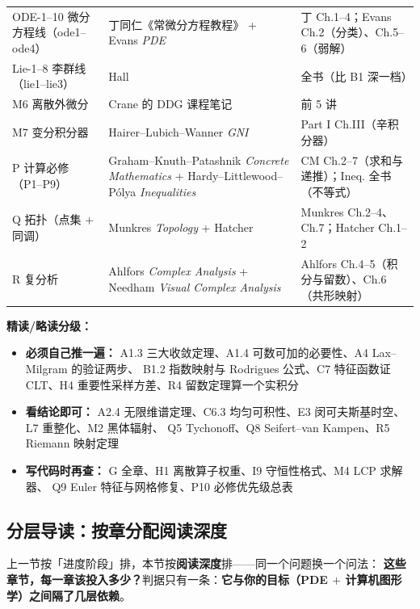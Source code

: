 \begin{center}
\begin{tabular}{L{3.9cm}L{5.2cm}L{5.5cm}}
ODE-1--10 微分方程线（ode1--ode4） & 丁同仁《常微分方程教程》 + Evans \emph{PDE} & 丁 Ch.1--4；Evans Ch.2（分类）、Ch.5--6（弱解） \\
Lie-1--8 李群线（lie1--lie3） & Hall & 全书（比 B1 深一档） \\
M6 离散外微分 & Crane 的 DDG 课程笔记 & 前 5 讲 \\
M7 变分积分器 & Hairer--Lubich--Wanner \emph{GNI} & Part I Ch.III（辛积分器） \\
P 计算必修（P1--P9） & Graham--Knuth--Patashnik \emph{Concrete Mathematics} + Hardy--Littlewood--Pólya \emph{Inequalities} & CM Ch.2--7（求和与递推）；Ineq. 全书（不等式） \\
Q 拓扑（点集 $+$ 同调） & Munkres \emph{Topology} + Hatcher & Munkres Ch.2--4、Ch.7；Hatcher Ch.1--2 \\
R 复分析 & Ahlfors \emph{Complex Analysis} + Needham \emph{Visual Complex Analysis} & Ahlfors Ch.4--5（积分与留数）、Ch.6（共形映射） \\
\bottomrule
\end{tabular}
\end{center}

\textbf{精读/略读分级：}
\begin{itemize}
  \item \textbf{必须自己推一遍：} A1.3 三大收敛定理、A1.4 可数可加的必要性、A4 Lax--Milgram 的验证两步、
        B1.2 指数映射与 Rodrigues 公式、C7 特征函数证 CLT、H4 重要性采样方差、R4 留数定理算一个实积分
  \item \textbf{看结论即可：} A2.4 无限维谱定理、C6.3 均匀可积性、E3 闵可夫斯基时空、L7 重整化、M2 黑体辐射、
        Q5 Tychonoff、Q8 Seifert--van Kampen、R5 Riemann 映射定理
  \item \textbf{写代码时再查：} G 全章、H1 离散算子权重、I9 守恒性格式、M4 LCP 求解器、
        Q9 Euler 特征与网格修复、P10 必修优先级总表
\end{itemize}

\clearpage
\subsection{分层导读：按章分配阅读深度}
\label{subsec:reading-depth}

上一节按「进度阶段」排，本节按\textbf{阅读深度}排——同一个问题换一个问法：
\textbf{这些章节，每一章该投入多少？}判据只有一条：\textbf{它与你的目标（PDE $+$ 计算机图形学）之间隔了几层依赖}。

